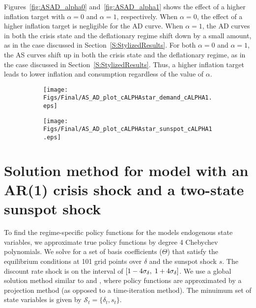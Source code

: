 \documentclass[11pt]{article}
\begin{document}
\begin{singlespace}
		Figures~\ref{fig:ASAD_alpha0} and~\ref{fig:ASAD_alpha1} shows the effect of a higher inflation target with $\alpha=0$ and $\alpha=1$, respectively. When $\alpha=0$, the effect of a higher inflation target is negligible for the AD curve. When $\alpha=1$, the AD curves in both the crisis state and the deflationary regime shift down by a small amount, as in the case discussed in Section~\ref{S:StylizedResults}. For both $\alpha=0$ and $\alpha=1$, the AS curves shift up in both the crisis state and the deflationary regime, as in the case discussed in Section~\ref{S:StylizedResults}. Thus, a higher inflation target leads to lower inflation and consumption regardless of the value of $\alpha$.

		\begin{figure}[h]
			\caption{AD and AS Curves: $\alpha = 1$} \label{fig:ASAD_alpha1}
	        \vspace{-1em}
			\begin{center}
				\begin{subfigure}[b]{0.4\textwidth}
					\centering		        	\texttt{[image: Figs/Final/AS\_AD\_plot\_cALPHAstar\_demand\_cALPHA1.eps]}
				\end{subfigure}
				\hspace{0.5cm}
				\begin{subfigure}[b]{0.4\textwidth}
					\centering					\texttt{[image: Figs/Final/AS\_AD\_plot\_cALPHAstar\_sunspot\_cALPHA1.eps]}
				\end{subfigure}
			\end{center}
		\end{figure}

		\section{Solution method for model with an AR(1) crisis shock and a two-state sunspot shock}
		\label{A:SolutionMethod}

        To find the regime-specific policy functions for the models endogenous state variables, we approximate true policy functions by degree 4 Chebychev polynomials. We solve for a set of basis coefficients ($\Theta$) that satisfy the equilibrium conditions at  101 grid points over $\delta$ and the sunspot shock $s$. The discount rate shock is on the interval of $[1-4\sigma_{\delta}, \hspace{0.1 cm} 1+4\sigma_{\delta}]$. We use a global solution method similar to \citet{Judd1992} and \citet{AruobaCubaBordaSchorfheide2018}, where policy functions are approximated by a projection method (as opposed to a time-iteration method). The minuimum set of state variables is given by $\mathcal{S}_t = \{\delta_t, s_t\}$.


\end{singlespace}
\end{document}
